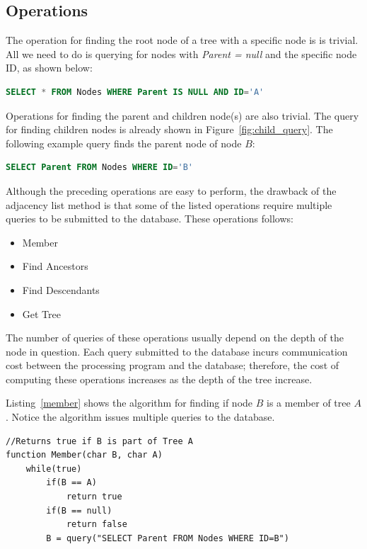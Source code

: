 \subsection{Operations}

The operation for finding the root node of a tree with a specific node is is trivial. All we need to do is querying for nodes with \emph{Parent = null} and the specific node ID, as shown below:

\begin{lstlisting}[language=sql, caption=Query for finding the root node for adjacency list method, label=fig:adj_list_find_root]
SELECT * FROM Nodes WHERE Parent IS NULL AND ID='A'
\end{lstlisting}

Operations for finding the parent and children node(s) are also trivial. The query for finding children nodes is already shown in Figure~\ref{fig:child_query}. The following example query finds the parent node of node $B$:

\begin{lstlisting}[language=sql, caption=Query for finding the parent node for adjacency list method., label=fig:adj_list_find_parent]
SELECT Parent FROM Nodes WHERE ID='B'
\end{lstlisting}

Although the preceding operations are easy to perform, the drawback of the adjacency list method is that some of the listed operations require multiple queries to be submitted to the database. These operations follows:

\begin{itemize}
\item Member
\item Find Ancestors
\item Find Descendants
\item Get Tree
\end{itemize}

The number of queries of these operations usually depend on the depth of the node in question. Each query submitted to the database incurs communication cost between the processing program and the database; therefore, the cost of computing these operations increases as the depth of the tree increase.

Listing~\ref{member} shows the algorithm for finding if node $B$ is a member of tree $A$. Notice the algorithm issues multiple queries to the database.

\begin{lstlisting}[caption={Algorithm for Member operation},label=member]
//Returns true if B is part of Tree A
function Member(char B, char A)
	while(true)
		if(B == A)
			return true
		if(B == null)
			return false
		B = query("SELECT Parent FROM Nodes WHERE ID=B")
\end{lstlisting}

